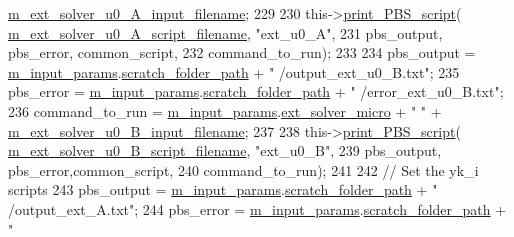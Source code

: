 \begin{DoxyCode}
      \hyperlink{classcarl_1_1_solver___files___setup_a32c0d90d116aab36f712795956403913}{m\_ext\_solver\_u0\_A\_input\_filename};
229 
230         this->\hyperlink{classcarl_1_1_solver___files___setup_a75c99aedd9396118e908379bb975ddac}{print\_PBS\_script}( 
      \hyperlink{classcarl_1_1_solver___files___setup_ac870acbdb942520edc49f0935605dd0b}{m\_ext\_solver\_u0\_A\_script\_filename}, \textcolor{stringliteral}{"ext\_u0\_A"},
231                             pbs\_output, pbs\_error, common\_script,
232                             command\_to\_run);
233 
234         pbs\_output = \hyperlink{classcarl_1_1_solver___files___setup_aa5804bf6c6e506b382766333f232d3d5}{m\_input\_params}.\hyperlink{structcarl_1_1feti__setup__init__params_a57e553748427905076bae85d239f9537}{scratch\_folder\_path} + \textcolor{stringliteral}{"
      /output\_ext\_u0\_B.txt"};
235         pbs\_error  = \hyperlink{classcarl_1_1_solver___files___setup_aa5804bf6c6e506b382766333f232d3d5}{m\_input\_params}.\hyperlink{structcarl_1_1feti__setup__init__params_a57e553748427905076bae85d239f9537}{scratch\_folder\_path} + \textcolor{stringliteral}{"
      /error\_ext\_u0\_B.txt"};
236         command\_to\_run = \hyperlink{classcarl_1_1_solver___files___setup_aa5804bf6c6e506b382766333f232d3d5}{m\_input\_params}.\hyperlink{structcarl_1_1feti__setup__init__params_aaa4b53d66e1dde62585701fab931a50c}{ext\_solver\_micro} + \textcolor{stringliteral}{" "} + 
      \hyperlink{classcarl_1_1_solver___files___setup_a682f749b73abaaffa3fdcd8b272eda2e}{m\_ext\_solver\_u0\_B\_input\_filename};
237 
238         this->\hyperlink{classcarl_1_1_solver___files___setup_a75c99aedd9396118e908379bb975ddac}{print\_PBS\_script}( 
      \hyperlink{classcarl_1_1_solver___files___setup_a890a41a7fb4b1130eb9fe558a9509af2}{m\_ext\_solver\_u0\_B\_script\_filename}, \textcolor{stringliteral}{"ext\_u0\_B"},
239                             pbs\_output, pbs\_error,common\_script,
240                             command\_to\_run);
241 
242         \textcolor{comment}{// Set the yk\_i scripts}
243         pbs\_output = \hyperlink{classcarl_1_1_solver___files___setup_aa5804bf6c6e506b382766333f232d3d5}{m\_input\_params}.\hyperlink{structcarl_1_1feti__setup__init__params_a57e553748427905076bae85d239f9537}{scratch\_folder\_path} + \textcolor{stringliteral}{"
      /output\_ext\_A.txt"};
244         pbs\_error  = \hyperlink{classcarl_1_1_solver___files___setup_aa5804bf6c6e506b382766333f232d3d5}{m\_input\_params}.\hyperlink{structcarl_1_1feti__setup__init__params_a57e553748427905076bae85d239f9537}{scratch\_folder\_path} + \textcolor{stringliteral}{"
}
\end{DoxyCode}
